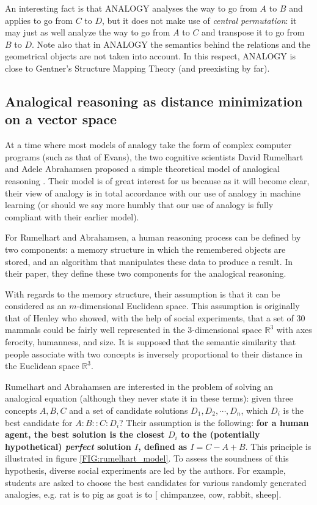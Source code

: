 An interesting fact is that ANALOGY analyses the way to go from $A$ to $B$ and
applies to go from $C$ to $D$, but it does not make use of \textit{central
permutation}: it may just as well analyze the way to go from $A$ to $C$ and
transpose it to go from $B$ to $D$. Note also that in ANALOGY the semantics
behind the relations and the geometrical objects are not taken into account. In
this respect, ANALOGY is close to Gentner's Structure Mapping Theory (and
preexisting by far).


\subsection{Analogical reasoning as distance minimization on a vector space}
\label{SEC:rumelhart_Abrahamsen}

At a time where most models of analogy take the form of complex computer
programs (such as that of Evans), the two cognitive scientists David Rumelhart
and Adele Abrahamsen proposed a simple theoretical model of analogical
reasoning \cite{RumAbr73}. Their model is of great interest for us because as
it will become clear, their view of analogy is in total accordance with our use
of analogy in machine learning (or should we say more humbly that our use of
analogy is fully compliant with their earlier model).

For Rumelhart and Abrahamsen, a human reasoning process can be defined by two
components: a memory structure in which the remembered objects are stored, and
an algorithm that manipulates these data to produce a result. In their paper,
they define these two components for the analogical reasoning.

With regards to the memory structure, their assumption is that it can be
considered as an $m$-dimensional Euclidean space. This assumption is originally
that of Henley \cite{Hen69} who showed, with the help of social experiments,
that a set of 30 mammals could be fairly well represented in the 3-dimensional
space $\mathbb{R}^3$ with axes ferocity, humanness, and size. It is supposed
that the semantic similarity that people associate with two concepts is
inversely proportional to their distance in the Euclidean space $\mathbb{R}^3$.

Rumelhart and Abrahamsen are interested in the problem of solving an analogical
equation (although they never state it in these terms): given three concepts
$A, B, C$ and a set of candidate solutions $D_1, D_2, \cdots, D_n$, which $D_i$
is the best candidate for $A:B::C:D_i$? Their assumption is the following:
\textbf{ for a human agent, the best solution is the closest $D_i$ to the
(potentially hypothetical) \textit{perfect} solution $I$, defined as $I = C - A
+ B$}. This principle is illustrated in figure \ref{FIG:rumelhart_model}.
To assess the soundness of this hypothesis, diverse social experiments are led
by the authors. For example, students are asked to choose the best candidates
for various randomly generated analogies, e.g. rat is to pig as goat is to $[$
chimpanzee, cow, rabbit, sheep$]$.

